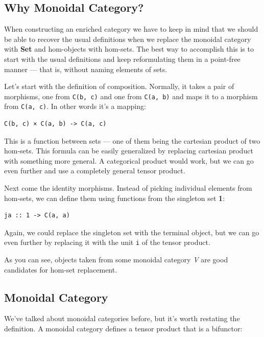 \subsection{Why Monoidal Category?}\label{why-monoidal-category}

When constructing an enriched category we have to keep in mind that we
should be able to recover the usual definitions when we replace the
monoidal category with \textbf{Set} and hom-objects with hom-sets. The
best way to accomplish this is to start with the usual definitions and
keep reformulating them in a point-free manner --- that is, without
naming elements of sets.

Let's start with the definition of composition. Normally, it takes a
pair of morphisms, one from \texttt{C(b,\ c)} and one from
\texttt{C(a,\ b)} and maps it to a morphism from \texttt{C(a,\ c)}. In
other words it's a mapping:

\begin{verbatim}
C(b, c) × C(a, b) -> C(a, c)
\end{verbatim}

This is a function between sets --- one of them being the cartesian
product of two hom-sets. This formula can be easily generalized by
replacing cartesian product with something more general. A categorical
product would work, but we can go even further and use a completely
general tensor product.

Next come the identity morphisms. Instead of picking individual elements
from hom-sets, we can define them using functions from the singleton set
\textbf{1}:

\begin{verbatim}
ja :: 1 -> C(a, a)
\end{verbatim}

Again, we could replace the singleton set with the terminal object, but
we can go even further by replacing it with the unit \texttt{i} of the
tensor product.

As you can see, objects taken from some monoidal category \emph{V} are
good candidates for hom-set replacement.

\subsection{Monoidal Category}\label{monoidal-category}

We've talked about monoidal categories before, but it's worth restating
the definition. A monoidal category defines a tensor product that is a
bifunctor:

